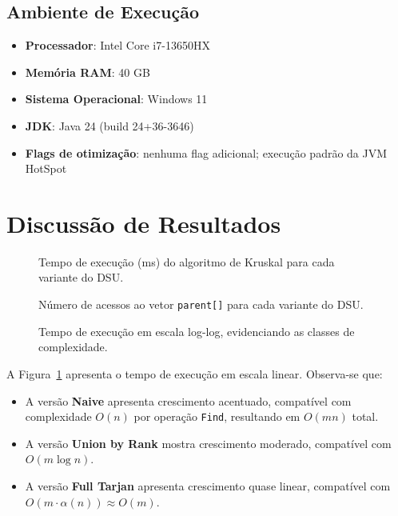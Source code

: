 \documentclass[12pt]{article}
\begin{document}
\subsection{Ambiente de Execução}

\begin{itemize}
    \item \textbf{Processador}: Intel Core i7-13650HX
    \item \textbf{Memória RAM}: 40 GB
    \item \textbf{Sistema Operacional}: Windows 11
    \item \textbf{JDK}: Java 24 (build 24+36-3646)
    \item \textbf{Flags de otimização}: nenhuma flag adicional; execução padrão da JVM HotSpot
\end{itemize}

\section{Discussão de Resultados}


\begin{figure}[ht]
\centering
\caption{Tempo de execução (ms) do algoritmo de Kruskal para cada variante do DSU.}
\label{fig:tempo}
\end{figure}

\begin{figure}[ht]
\centering
\caption{Número de acessos ao vetor \texttt{parent[]} para cada variante do DSU.}
\label{fig:acessos}
\end{figure}

\begin{figure}[ht]
\centering
\caption{Tempo de execução em escala log-log, evidenciando as classes de complexidade.}
\label{fig:loglog}
\end{figure}

A Figura~\ref{fig:tempo} apresenta o tempo de execução em escala linear. Observa-se que:

\begin{itemize}
    \item A versão \textbf{Naive} apresenta crescimento acentuado, compatível com complexidade $O(n)$ por operação \texttt{Find}, resultando em $O(mn)$ total.
    \item A versão \textbf{Union by Rank} mostra crescimento moderado, compatível com $O(m \log n)$.
    \item A versão \textbf{Full Tarjan} apresenta crescimento quase linear, compatível com $O(m \cdot \alpha(n)) \approx O(m)$.
\end{itemize}
\end{document}
